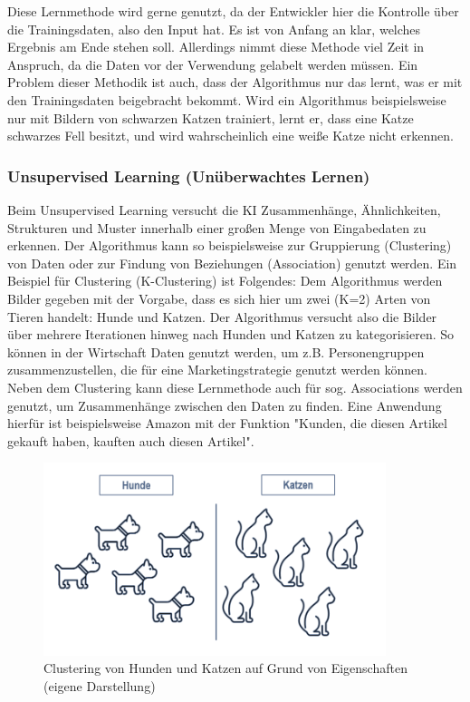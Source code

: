\documentclass[a4paper,12pt, german]{report}
\begin{document}
Diese Lernmethode wird gerne genutzt, da der Entwickler hier die Kontrolle über die Trainingsdaten, also den Input hat. Es ist von Anfang an klar, welches Ergebnis am Ende stehen soll. Allerdings nimmt diese Methode viel Zeit in Anspruch, da die Daten vor der Verwendung gelabelt werden müssen. Ein Problem dieser Methodik ist auch, dass der Algorithmus nur das lernt, was er mit den Trainingsdaten beigebracht bekommt. Wird ein Algorithmus beispielsweise nur mit Bildern von schwarzen Katzen trainiert, lernt er, dass eine Katze schwarzes Fell besitzt, und wird wahrscheinlich eine weiße Katze nicht erkennen.

\subsubsection{Unsupervised Learning (Unüberwachtes Lernen)} 

Beim Unsupervised Learning versucht die KI Zusammenhänge, Ähnlichkeiten, Strukturen und Muster innerhalb einer großen Menge von Eingabedaten zu erkennen. Der Algorithmus kann so beispielsweise zur Gruppierung (Clustering) von Daten oder zur Findung von Beziehungen (Association) genutzt werden.\newline
Ein Beispiel für Clustering (K-Clustering) ist Folgendes: Dem Algorithmus werden Bilder gegeben mit der Vorgabe, dass es sich hier um zwei (K=2) Arten von Tieren handelt: Hunde und Katzen. Der Algorithmus versucht also die Bilder über mehrere Iterationen hinweg nach Hunden und Katzen zu kategorisieren. So können in der Wirtschaft Daten genutzt werden, um z.B. Personengruppen zusammenzustellen, die für eine Marketingstrategie genutzt werden können. \newline
Neben dem Clustering kann diese Lernmethode auch für sog. Associations werden genutzt, um Zusammenhänge zwischen den Daten zu finden. Eine Anwendung hierfür ist beispielsweise Amazon mit der Funktion "Kunden, die diesen Artikel gekauft haben, kauften auch diesen Artikel".\cite{01} 
\begin{figure}
  \center
  \includegraphics[width=10cm]{images/unsupervised.png}
  \caption[Clustering von Hunden und Katzen auf Grund von Eigenschaften]{Clustering von Hunden und Katzen auf Grund von Eigenschaften (eigene Darstellung)}
\end{figure}
\end{document}
